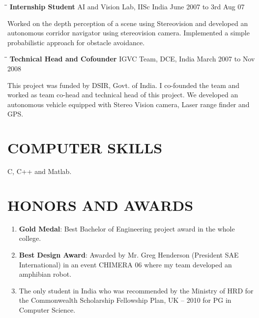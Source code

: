 \documentclass{res}
\begin{document}
\begin{resume}
        \begin{tabbing}%
        \hspace{2.3in}\= \hspace{2.6in}\= \kill %
{\bf Internship Student}  \>AI and Vision Lab, IISc India \> June 2007 to 3rd Aug 07

        \end{tabbing}\vspace{-18pt}
        Worked on the depth perception of a scene using Stereovision and developed an autonomous corridor navigator using stereovision camera. Implemented a simple probabilistic approach for obstacle avoidance.

        \begin{tabbing}%
        \hspace{2.3in}\= \hspace{2.6in}\= \kill %
{\bf Technical Head and Cofounder}  \>IGVC Team, DCE, India\> March 2007 to Nov 2008
        \end{tabbing}\vspace{-18pt}
        This project was funded by DSIR, Govt. of India. I co-founded the team and worked as team co-head and technical head of this project. We developed an autonomous vehicle equipped with Stereo Vision camera, Laser range finder and GPS. 

        \section{COMPUTER SKILLS}          
        C, C++ and Matlab. \\             
\vspace{-10pt}
        \section{HONORS AND AWARDS}  
        \begin{enumerate}
        \item {\bf Gold Medal}: Best Bachelor of Engineering project award in the whole college.
        \item {\bf Best Design Award}: Awarded by Mr. Greg Henderson (President SAE International) in an event CHIMERA 06 where my team developed an amphibian robot.
        \item The only student in India who was recommended by the Ministry of HRD for the Commonwealth Scholarship Fellowship Plan, UK – 2010 for PG in Computer Science.


\end{enumerate}
\end{resume}
\end{document}
